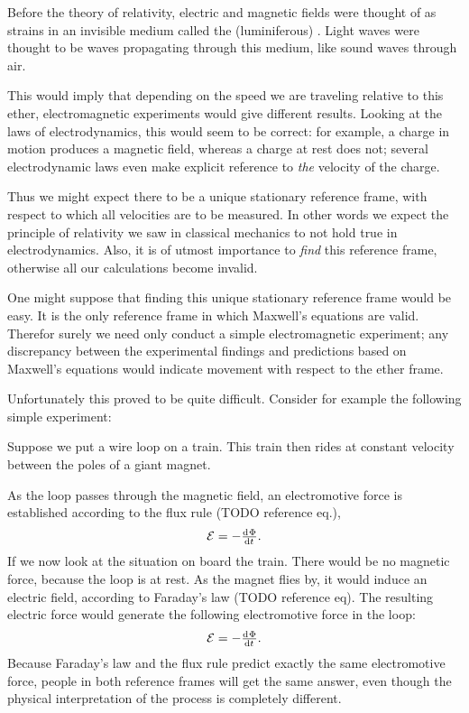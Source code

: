 Before the theory of relativity, electric and magnetic fields were thought of as strains in an invisible medium called the (luminiferous) . Light waves were thought to be waves propagating through this medium, like sound waves through air.

This would imply that depending on the speed we are traveling relative to this ether, electromagnetic experiments would give different results. Looking at the laws of electrodynamics, this would seem to be correct: for example, a charge in motion produces a magnetic field, whereas a charge at rest does not; several electrodynamic laws even make explicit reference to \emph{the} velocity of the charge.

Thus we might expect there to be a unique stationary reference frame, with respect to which all velocities are to be measured. In other words we expect the principle of relativity we saw in classical mechanics to not hold true in electrodynamics. Also, it is of utmost importance to \emph{find} this reference frame, otherwise all our calculations become invalid.

One might suppose that finding this unique stationary reference frame would be easy. It is the only reference frame in which Maxwell's equations are valid. Therefor surely we need only conduct a simple electromagnetic experiment; any discrepancy between the experimental findings and predictions based on Maxwell's equations would indicate movement with respect to the ether frame.

Unfortunately this proved to be quite difficult. Consider for example the following simple experiment:

\begin{example}

Suppose we put a wire loop on a train. This train then rides at constant velocity between the poles of a giant magnet.

As the loop passes through the magnetic field, an electromotive force is established according to the flux rule (TODO reference eq.),
\[ \mathcal{E} = - \od{\Phi}{t}. \]
If we now look at the situation on board the train. There would be no magnetic force, because the loop is at rest. As the magnet flies by, it would induce an electric field, according to Faraday's law (TODO reference eq). The resulting electric force would generate the following electromotive force in the loop:
\[ \mathcal{E} = - \od{\Phi}{t}. \]
Because Faraday's law and the flux rule predict exactly the same electromotive force, people in both reference frames will get the same answer, even though the physical interpretation of the process is completely different.
\end{example}


